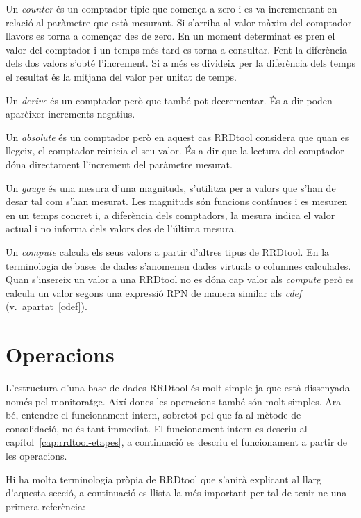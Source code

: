 Un \emph{counter} és un  comptador típic que comença a zero i es va incrementant en relació al paràmetre que està mesurant. Si s'arriba al valor màxim del comptador llavors es torna a començar des de zero. En un moment determinat es pren el valor del comptador i un temps més tard es torna a consultar. Fent la diferència dels dos valors s'obté l'increment. Si a més es divideix per la diferència dels temps el resultat és la mitjana del valor per unitat de temps.

Un \emph{derive} és un comptador però que també pot decrementar. És a dir poden aparèixer increments negatius. 

Un \emph{absolute} és un comptador però en aquest cas RRDtool considera que quan es llegeix, el comptador reinicia el seu valor. És a dir que la lectura del comptador dóna directament l'increment del paràmetre mesurat.

Un \emph{gauge} és una mesura d'una magnituds, s'utilitza per a valors que s'han de desar tal com s'han mesurat.  Les magnituds són funcions contínues i es mesuren en un temps concret i, a diferència dels comptadors, la mesura indica el valor actual i no informa dels valors des de l'última mesura. 

Un \emph{compute} calcula els seus valors a partir d'altres tipus de RRDtool. En la terminologia de bases de dades s'anomenen dades virtuals o columnes calculades. Quan s'insereix un valor a una RRDtool no es dóna cap valor als \emph{compute} però es calcula un valor segons una expressió RPN de manera similar als \emph{cdef} (v.\ apartat~\ref{cdef}).  


\section{Operacions}\label{RRDoperacions}

L'estructura d'una base de dades RRDtool és molt simple ja que està dissenyada només pel monitoratge. Així doncs les operacions també són molt simples. Ara bé, entendre el funcionament intern, sobretot pel que fa al mètode de consolidació, no és tant immediat. El funcionament intern es descriu al capítol~\ref{cap:rrdtool-etapes}, a continuació es descriu el funcionament a partir de les operacions.

Hi ha molta terminologia pròpia de RRDtool que s'anirà explicant al llarg d'aquesta secció, a continuació es llista la més important per tal de tenir-ne una primera referència:

